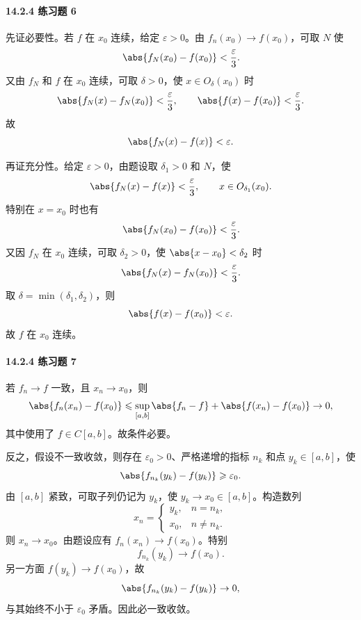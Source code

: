\paragraph{14.2.4 练习题 6}
\begin{xsolution}
先证必要性。若 $f$ 在 $x_0$ 连续，给定 $\varepsilon>0$。由 $f_n(x_0)\to f(x_0)$，可取 $N$ 使
\[
  \abs{f_N(x_0)-f(x_0)}<\frac\varepsilon3.
\]
又由 $f_N$ 和 $f$ 在 $x_0$ 连续，可取 $\delta>0$，使 $x\in O_\delta(x_0)$ 时
\[
  \abs{f_N(x)-f_N(x_0)}<\frac\varepsilon3,
  \qquad
  \abs{f(x)-f(x_0)}<\frac\varepsilon3.
\]
故
\[
  \abs{f_N(x)-f(x)}<\varepsilon.
\]

再证充分性。给定 $\varepsilon>0$，由题设取 $\delta_1>0$ 和 $N$，使
\[
  \abs{f_N(x)-f(x)}<\frac\varepsilon3,
  \qquad x\in O_{\delta_1}(x_0).
\]
特别在 $x=x_0$ 时也有
\[
  \abs{f_N(x_0)-f(x_0)}<\frac\varepsilon3.
\]
又因 $f_N$ 在 $x_0$ 连续，可取 $\delta_2>0$，使 $\abs{x-x_0}<\delta_2$ 时
\[
  \abs{f_N(x)-f_N(x_0)}<\frac\varepsilon3.
\]
取 $\delta=\min(\delta_1,\delta_2)$，则
\[
  \abs{f(x)-f(x_0)}<\varepsilon.
\]
故 $f$ 在 $x_0$ 连续。
\end{xsolution}

\paragraph{14.2.4 练习题 7}
\begin{xsolution}
若 $f_n\to f$ 一致，且 $x_n\to x_0$，则
\[
  \abs{f_n(x_n)-f(x_0)}
  \leqslant\sup_{[a,b]}\abs{f_n-f}+\abs{f(x_n)-f(x_0)}\to0,
\]
其中使用了 $f\in C[a,b]$。故条件必要。

反之，假设不一致收敛，则存在 $\varepsilon_0>0$、严格递增的指标 $n_k$ 和点 $y_k\in[a,b]$，使
\[
  \abs{f_{n_k}(y_k)-f(y_k)}\geqslant\varepsilon_0.
\]
由 $[a,b]$ 紧致，可取子列仍记为 $y_k$，使 $y_k\to x_0\in[a,b]$。构造数列
\[
  x_n=
  \begin{cases}
    y_k,&n=n_k,\\
    x_0,&n\ne n_k.
  \end{cases}
\]
则 $x_n\to x_0$。由题设应有 $f_n(x_n)\to f(x_0)$。特别
\[
  f_{n_k}(y_k)\to f(x_0).
\]
另一方面 $f(y_k)\to f(x_0)$，故
\[
  \abs{f_{n_k}(y_k)-f(y_k)}\to0,
\]
与其始终不小于 $\varepsilon_0$ 矛盾。因此必一致收敛。
\end{xsolution}

